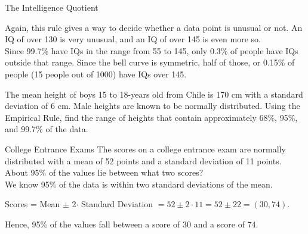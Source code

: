 \begin{example}[https://www.youtube.com/watch?v=cTRr0B5Cp8k]{The Intelligence Quotient}
\begin{center}
\end{center}

Again, this rule gives a way to decide whether a data point is unusual or not.  An IQ of over 130 is very unusual, and an IQ of over 145 is even more so.\\

Since 99.7\% have IQs in the range from 55 to 145, only 0.3\% of people have IQs outside that range.  Since the bell curve is symmetric, half of those, or 0.15\% of people (15 people out of 1000) have IQs over 145.
\end{example}

\begin{try}
The mean height of boys 15 to 18-years old from Chile is 170 cm with a standard deviation of 6 cm. Male heights are known to be normally distributed. Using the Empirical Rule, find the range of heights that contain approximately 68\%, 95\%, and 99.7\% of the data.
\end{try}

\begin{example}[https://www.youtube.com/watch?v=XcZCDQln9L0]{College Entrance Exams}
The scores on a college entrance exam are normally distributed with a mean of 52 points and a standard deviation of 11 points. About 95\% of the values lie between what two scores?\\

We know 95\% of the data is within two standard deviations of the mean. 

Scores = Mean $\pm$ 2$\cdot$ Standard Deviation $= 52 \pm 2\cdot11 = 52 \pm 22 = (30, 74)$.

Hence, 95\% of the values fall between a score of 30 and a score of 74.
\end{example}
\pagebreak

